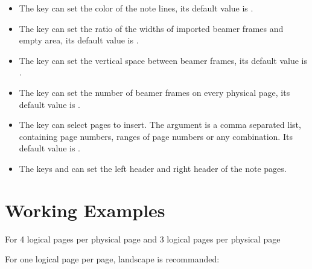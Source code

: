 \documentclass[svgnames,letterpaper]{l3doc}
\begin{document}
\begin{itemize}
  \item The key  can set the color of the note lines, its default value is .
  \item The key  can set the ratio of the widths of imported beamer frames and empty area, its default value is .
  \item The key  can set the vertical space between beamer frames, its default value is \cmd{2ex}.
  \item The key  can set the number of beamer frames on every physical page, its default value is .
  \item The key  can select pages to insert. The argument is a comma separated list, containing page numbers, ranges of page numbers or any combination. Its default value is .
  \item The keys  and  can set the left header and right header of the note pages.
\end{itemize}

\section{Working Examples}

For 4 logical pages per physical page and 3 logical pages per physical page

\begin{framed}
  
\end{framed}

For one logical page per page, landscape is recommanded:

\begin{framed}
  
\end{framed}

\end{document}
